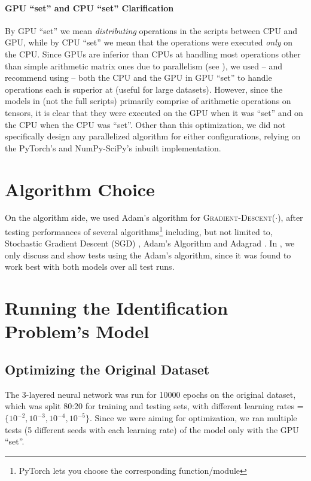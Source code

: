 \paragraph{GPU ``set'' and CPU ``set'' Clarification}
By GPU ``set'' we mean \textit{distributing} operations in the scripts between CPU and GPU, while by CPU ``set'' we mean that the operations were executed \textit{only} on the CPU. Since GPUs are inferior than CPUs at handling most operations other than simple arithmetic matrix ones due to parallelism (see ), we used -- and recommend using -- both the CPU and the GPU in GPU ``set'' to handle operations each is superior at (useful for large datasets). However, since the models in  (not the full scripts) primarily comprise of arithmetic operations on  tensors, it is clear that they were executed on the GPU when it was ``set'' and on the CPU when the CPU was ``set''. Other than this optimization, we did not specifically design any parallelized algorithm for either configurations, relying on the PyTorch's and NumPy-SciPy's inbuilt implementation.

\section{Algorithm Choice} \label{sec:Algorithm Choice}
On the algorithm side, we used Adam's algorithm for \textsc{Gradient-Descent}($\cdot$), after testing performances of several algorithms\footnote{PyTorch lets you choose the corresponding function/module} including, but not limited to, Stochastic Gradient Descent (SGD) \cite{SGD}, Adam's Algorithm \cite{Adam} and Adagrad \cite{Adagrad}. In , we only discuss and show tests using the Adam's algorithm, since it was found to work best with both models over all test runs.

\section{Running the Identification Problem's Model} \label{sec:Running the Identification Problem's Model}
\subsection{Optimizing the Original Dataset} \label{sec:Identification Problem-Optimizing the Original Dataset}
The 3-layered neural network was run for 10000 epochs on the original dataset, which was split 80:20 for training and testing sets, with different learning rates = $\{10^{-2}, 10^{-3}, 10^{-4}, 10^{-5}\}$. Since we were aiming for optimization, we ran multiple tests (5 different seeds with each learning rate) of the model only with the GPU ``set''.

